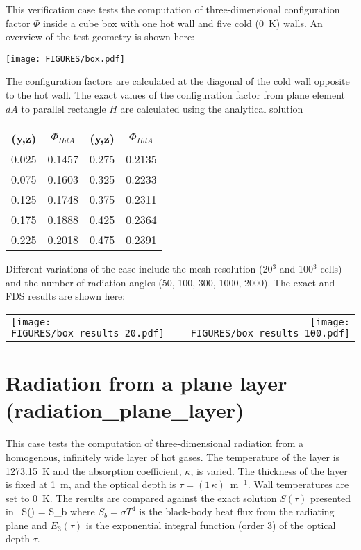 \documentclass[11pt]{book}
\begin{document}
This verification case tests the computation of three-dimensional configuration factor $\Phi$ inside a cube box with one hot wall and five cold (0~K)
walls. An overview of the test geometry is shown here:
\begin{center}
\texttt{[image: FIGURES/box.pdf]}
\end{center}
The configuration factors are calculated at the diagonal of the cold wall opposite to the hot wall. The exact values of the configuration factor from
plane element $dA$ to parallel rectangle $H$ are calculated using the analytical solution~\cite{Siegel:1}

\begin{center}
\begin{tabular}{|c|c|c|c|}
\hline (y,z) & $\Phi_{HdA}$ & (y,z) & $\Phi_{HdA}$ \\ \hline \hline
0.025   &0.1457 & 0.275 &0.2135 \\
0.075   &0.1603 & 0.325 &0.2233 \\
0.125   &0.1748 & 0.375 &0.2311 \\
0.175   &0.1888 & 0.425 &0.2364 \\
0.225   &0.2018 & 0.475 &0.2391 \\ \hline
\end{tabular}
\end{center}

\noindent Different variations of the case include the mesh resolution (20$^3$ and 100$^3$ cells) and the number of radiation angles (50, 100, 300,
1000, 2000). The exact and FDS results are shown here:

\begin{tabular*}{\textwidth}{lr}
\texttt{[image: FIGURES/box\_results\_20.pdf]} &
\texttt{[image: FIGURES/box\_results\_100.pdf]}
\end{tabular*}





\clearpage

\section{Radiation from a plane layer (\texorpdfstring{{\bf radiation\_plane\_layer}}{radiation\_plane\_layer})}
\label{radiation_plane_layer}

This case tests the computation of three-dimensional radiation from a homogenous, infinitely wide layer of hot gases.  The temperature of
the layer is 1273.15~K and the absorption coefficient, $\kappa$, is varied. The thickness of the layer is fixed at 1~m, and the optical depth is $\tau = (1 \, \kappa)$~m$^{-1}$.
Wall temperatures are set to 0~K. The results are compared against the exact solution $S(\tau)$ presented in~\cite{Zeldovich:1}
\be S(\tau) = S_b \ee
where $S_b = \sigma T^4$ is the black-body heat flux from the radiating plane and $E_3(\tau)$ is the exponential
integral function (order 3) of the optical depth $\tau$.
\end{document}

